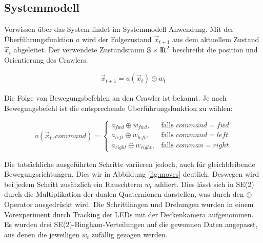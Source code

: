 \subsection{Systemmodell}
Vorwissen über das System findet im Systemmodell Anwendung. Mit der Überführungsfunktion $a$ wird der Folgezustand $\vec{x}_{t+1}$ aus dem aktuellem Zustand $\vec{x}_t$ abgeleitet. Der verwendete Zustandsraum $\mathbb{S} \times \mathrm{I\hspace{-2pt}R}^2$ beschreibt die position und Orientierung des Crawlers.


\begin{align*}
\vec{x}_{t+1} = a(\vec{x}_t) \oplus w_t
\end{align*}

Die Folge von Bewegungsbefehlen an den Crawler ist bekannt. Je nach Bewegungsbefehl ist die entsprechende Überführungsfunktion zu wählen:

\begin{equation}
    a(\vec{x}_t, command) = 
        \begin{cases}
            a_{fwd} \oplus w_{fwd},& \text{falls } command= fwd \\
            a_{left} \oplus w_{left},& \text{falls } command= left\\
            a_{right} \oplus w_{right},& \text{falls } comman= right
        \end{cases}
\end{equation}

Die tatsächliche ausgeführten Schritte variieren jedoch, auch für gleichbleibende Bewegungsrichtungen. Dies wir in Abbildung \ref{fig:moves} deutlich. Deswegen wird bei jedem Schritt zusätzlich ein Rauschterm $w_t$ addiert. Dies lässt sich in SE(2) durch die Multiplikation der dualen Quaternionen darstellen, was durch den $\oplus$-Operator ausgedrückt wird.
Die Schrittlängen und Drehungen wurden in einem Vorexperiment durch Tracking der LEDs mit der Deckenkamera aufgenommen. Es wurden drei SE(2)-Bingham-Verteilungen auf die gewonnen Daten angepasst, aus denen die jeweiligen $w_t$ zufällig gezogen werden.





